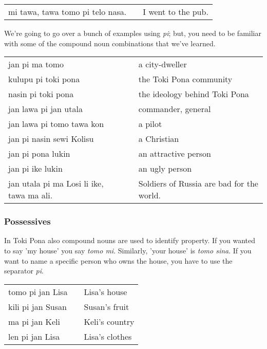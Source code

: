 \begin{supertabular}{p{5,5cm}|ll}
mi tawa, tawa tomo pi telo nasa. && I went to the pub. \\ 
\end{supertabular}  

We're going to go over a bunch of examples using \textit{pi}; but, you need to be familiar with some of the compound noun combinations that we've learned. 

\begin{supertabular}{p{5,5cm}|ll}
jan pi ma tomo && a city-dweller \\
kulupu pi toki pona && the Toki Pona community \\
nasin pi toki pona && the ideology behind Toki Pona \\
jan lawa pi jan utala && commander, general \\
jan lawa pi tomo tawa kon && a pilot \\
jan pi nasin sewi Kolisu && a Christian \\
jan pi pona lukin && an attractive person \\
jan pi ike lukin && an ugly person \\
jan utala pi ma Losi li ike, tawa ma ali. && Soldiers of Russia are bad for the world. \\
\end{supertabular} 

%
\newpage
%
\subsubsection*{Possessives}

In Toki Pona also compound nouns are used to identify property. 
If you wanted to say 'my house' you say \textit{tomo mi}. 
Similarly, 'your house' is \textit{tomo sina}. 
If you want to name a specific person who owns the house, you have to use the separator \textit{pi}. 

\begin{supertabular}{p{5,5cm}|ll}
tomo pi jan Lisa && Lisa's house \\
kili pi jan Susan && Susan's fruit \\
ma pi jan Keli && Keli's country \\
len pi jan Lisa && Lisa's clothes \\
\end{supertabular}  

